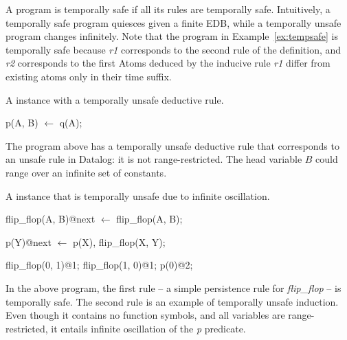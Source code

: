 
A \slang program is temporally safe if all its rules are temporally safe.
Intuitively, a temporally safe program quiesces given a finite EDB, while a
temporally unsafe program changes infinitely.  Note that the \slang program in
Example~\ref{ex:tempsafe} is temporally safe because \emph{r1} corresponds to
the second rule of the definition, and \emph{r2} corresponds to the first Atoms
deduced by the inducive rule \emph{r1} differ from existing atoms only in their
time suffix.

\begin{example}
A \slang instance with a temporally unsafe deductive rule.

\begin{Dedalus}
p(A, B) \(\leftarrow\) q(A);
\end{Dedalus}

The program above has a temporally unsafe deductive rule that corresponds to an
unsafe rule in Datalog: it is not range-restricted.  The head variable $B$
could range over an infinite set of constants.
\end{example}


\begin{example} 
%
A \slang instance that is temporally unsafe due to infinite oscillation.

\begin{Dedalus}
flip\_flop(A, B)@next \(\leftarrow\) flip\_flop(A, B);

p(Y)@next \(\leftarrow\) p(X), flip\_flop(X, Y);

flip\_flop(0, 1)@1;
flip\_flop(1, 0)@1;
p(0)@2;
\end{Dedalus}

In the above program, the first rule -- a simple persistence rule for
\emph{flip\_flop} -- is temporally safe.  The second rule is an example of
temporally unsafe induction.  Even though it contains no function symbols, and
all variables are range-restricted, it entails infinite oscillation of the
\emph{p} predicate.  
\end{example}

